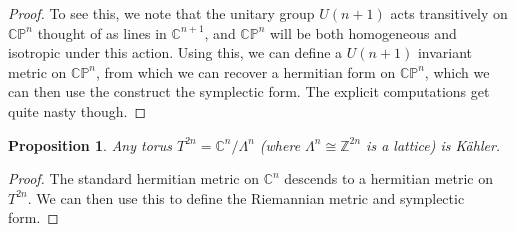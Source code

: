 \documentclass[psamsfonts]{amsart}
\newtheorem{prop}[thm]{Proposition}
\theoremstyle{definition}
\theoremstyle{remark}
\newcommand{\Z}{\mathbb{Z}}
\newcommand{\C}{\mathbb{C}}
\newcommand{\CP}{\mathbb{CP}}
\begin{document}
%
\begin{proof}
To see this, we note that the unitary group $U(n+1)$ acts transitively on $\CP^n$ thought of as lines in $\C^{n+1}$, and $\CP^n$ will be both homogeneous and isotropic under this action. Using this, we can define a $U(n+1)$ invariant metric on $\CP^n$, from which we can recover a hermitian form on $\CP^n$, which we can then use the construct the symplectic form. The explicit computations get quite nasty though.
\end{proof}
%
\begin{prop}
Any torus $T^{2n} = \C^n / \Lambda^n$ (where $\Lambda^n \cong \Z^{2n}$ is a lattice) is K\"ahler.
\end{prop}
%
\begin{proof}
The standard hermitian metric on $\C^n$ descends to a hermitian metric on $T^{2n}$. We can then use this to define the Riemannian metric and symplectic form.
\end{proof}
%
\end{document}
